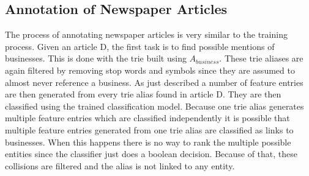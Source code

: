 \subsection{Annotation of Newspaper Articles}
The process of annotating newspaper articles is very similar to the training process. Given an article D, the first task is to find possible mentions of businesses. This is done with the trie built using $A_{business}$. These trie aliases are again filtered by removing stop words and symbols since they are assumed to almost never reference a business. As just described a number of feature entries are then generated from every trie alias found in article D. They are then classified using the trained classification model. Because one trie alias generates multiple feature entries which are classified independently it is possible that multiple feature entries generated from one trie alias are classified as links to businesses. When this happens there is no way to rank the multiple possible entities since the classifier just does a boolean decision. Because of that, these collisions are filtered and the alias is not linked to any entity. %
